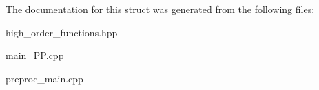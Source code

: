 The documentation for this struct was generated from the following files\+:\begin{DoxyCompactItemize}
\item 
high\+\_\+order\+\_\+functions.\+hpp\item 
main\+\_\+\+P\+P.\+cpp\item 
preproc\+\_\+main.\+cpp\end{DoxyCompactItemize}
